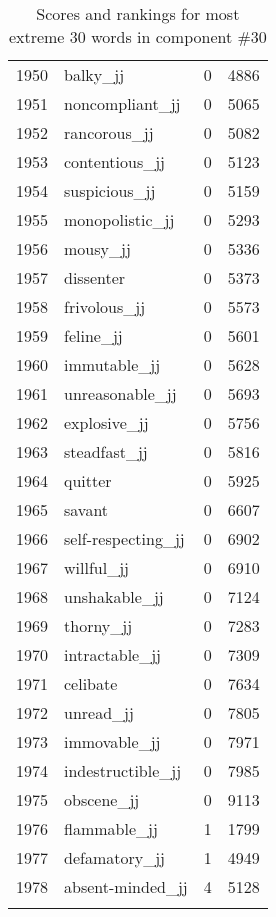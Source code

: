 \begin{longtable}[!htbp]{| rlr@{.}l |}
    1950 & balky\_jj & 0 & 4886 \\
    1951 & noncompliant\_jj & 0 & 5065 \\
    1952 & rancorous\_jj & 0 & 5082 \\
    1953 & contentious\_jj & 0 & 5123 \\
    1954 & suspicious\_jj & 0 & 5159 \\
    1955 & monopolistic\_jj & 0 & 5293 \\
    1956 & mousy\_jj & 0 & 5336 \\
    1957 & dissenter & 0 & 5373 \\
    1958 & frivolous\_jj & 0 & 5573 \\
    1959 & feline\_jj & 0 & 5601 \\
    1960 & immutable\_jj & 0 & 5628 \\
    1961 & unreasonable\_jj & 0 & 5693 \\
    1962 & explosive\_jj & 0 & 5756 \\
    1963 & steadfast\_jj & 0 & 5816 \\
    1964 & quitter & 0 & 5925 \\
    1965 & savant & 0 & 6607 \\
    1966 & self-respecting\_jj & 0 & 6902 \\
    1967 & willful\_jj & 0 & 6910 \\
    1968 & unshakable\_jj & 0 & 7124 \\
    1969 & thorny\_jj & 0 & 7283 \\
    1970 & intractable\_jj & 0 & 7309 \\
    1971 & celibate & 0 & 7634 \\
    1972 & unread\_jj & 0 & 7805 \\
    1973 & immovable\_jj & 0 & 7971 \\
    1974 & indestructible\_jj & 0 & 7985 \\
    1975 & obscene\_jj & 0 & 9113 \\
    1976 & flammable\_jj & 1 & 1799 \\
    1977 & defamatory\_jj & 1 & 4949 \\
    1978 & absent-minded\_jj & 4 & 5128 \\
    \hline
    \caption{Scores and rankings for most extreme 30 words in component \#30} \\
\end{longtable}
